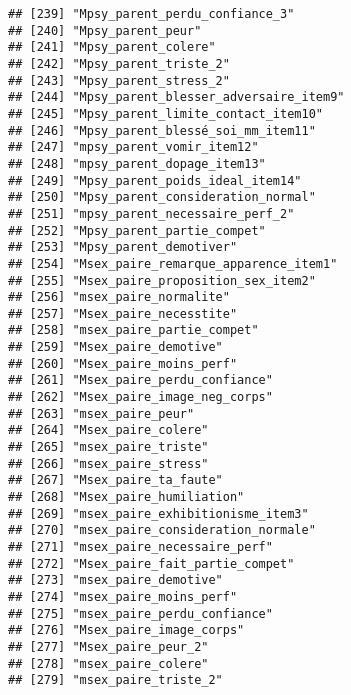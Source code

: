 \documentclass[
]{article}
\begin{document}
\begin{verbatim}
## [239] "Mpsy_parent_perdu_confiance_3"                       
## [240] "Mpsy_parent_peur"                                    
## [241] "Mpsy_parent_colere"                                  
## [242] "Mpsy_parent_triste_2"                                
## [243] "Mpsy_parent_stress_2"                                
## [244] "Mpsy_parent_blesser_adversaire_item9"                
## [245] "Mpsy_parent_limite_contact_item10"                   
## [246] "Mpsy_parent_blessé_soi_mm_item11"                    
## [247] "mpsy_parent_vomir_item12"                            
## [248] "mpsy_parent_dopage_item13"                           
## [249] "Mpsy_parent_poids_ideal_item14"                      
## [250] "Mpsy_parent_consideration_normal"                    
## [251] "mpsy_parent_necessaire_perf_2"                       
## [252] "Mpsy_parent_partie_compet"                           
## [253] "Mpsy_parent_demotiver"                               
## [254] "Msex_paire_remarque_apparence_item1"                 
## [255] "Msex_paire_proposition_sex_item2"                    
## [256] "msex_paire_normalite"                                
## [257] "Msex_paire_necesstite"                               
## [258] "msex_paire_partie_compet"                            
## [259] "Msex_paire_demotive"                                 
## [260] "Msex_paire_moins_perf"                               
## [261] "Msex_paire_perdu_confiance"                          
## [262] "Msex_paire_image_neg_corps"                          
## [263] "msex_paire_peur"                                     
## [264] "Msex_paire_colere"                                   
## [265] "msex_paire_triste"                                   
## [266] "msex_paire_stress"                                   
## [267] "Msex_paire_ta_faute"                                 
## [268] "Msex_paire_humiliation"                              
## [269] "msex_paire_exhibitionisme_item3"                     
## [270] "msex_paire_consideration_normale"                    
## [271] "msex_paire_necessaire_perf"                          
## [272] "Msex_paire_fait_partie_compet"                       
## [273] "msex_paire_demotive"                                 
## [274] "msex_paire_moins_perf"                               
## [275] "msex_paire_perdu_confiance"                          
## [276] "Msex_paire_image_corps"                              
## [277] "Msex_paire_peur_2"                                   
## [278] "msex_paire_colere"                                   
## [279] "msex_paire_triste_2"                                 

\end{verbatim}
\end{document}
